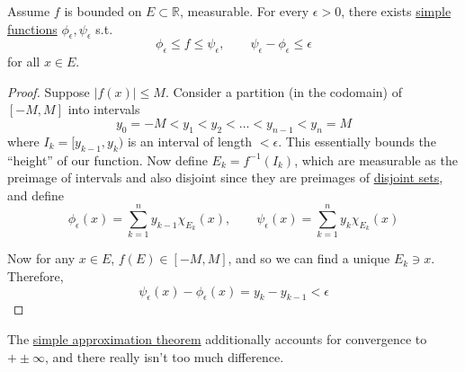   \begin{lemma}
    \label{thm:simple-approximations-for-bounded-functions}
    Assume $f$ is bounded on $E \subset \mathbb{R}$, measurable. For every $\epsilon > 0$, there exists \hyperref[def:simple-functions]{simple functions} $\phi_\epsilon, \psi_\epsilon$ s.t. 
    \begin{equation}
      \phi_\epsilon \leq f \leq \psi_\epsilon, \qquad \psi_\epsilon - \phi_\epsilon \leq \epsilon
    \end{equation}
    for all $x \in E$. 
  \end{lemma}
  \begin{proof}
    Suppose $|f(x)| \leq M$. Consider a partition (in the codomain) of $[-M, M]$ into intervals 
    \begin{equation}
      y_0 = -M < y_1 < y_2 < \ldots < y_{n-1} < y_n = M
    \end{equation}
    where $I_k = [y_{k-1}, y_k)$ is an interval of length $< \epsilon$. This essentially bounds the ``height'' of our function. Now define $E_k = f^{-1} (I_k)$, which are measurable as the preimage of intervals and also disjoint since they are preimages of \hyperref[st-def:disjoint-sets]{disjoint sets}, and define 
    \begin{equation}
      \phi_\epsilon(x) = \sum_{k=1}^n y_{k-1} \chi_{E_k} (x) , \qquad \psi_\epsilon (x) = \sum_{k=1}^n y_k \chi_{E_k} (x) 
    \end{equation}

    Now for any $x \in E$, $f(E) \in [-M, M]$, and so we can find a unique $E_k \ni x$. Therefore, 
    \begin{equation}
      \psi_\epsilon (x) - \phi_\epsilon(x) = y_k - y_{k-1} < \epsilon 
    \end{equation}
  \end{proof}

  The \hyperref[thm:simple-approximation-theorem]{simple approximation theorem} additionally accounts for convergence to $+\pm \infty$, and there really isn't too much difference. 


